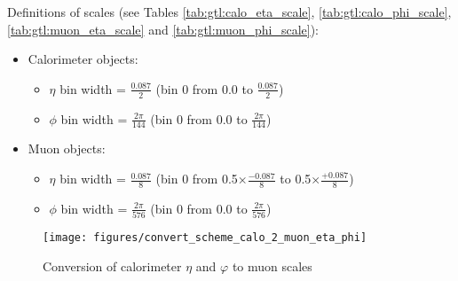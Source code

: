 Definitions of scales (see Tables \ref{tab:gtl:calo_eta_scale}, \ref{tab:gtl:calo_phi_scale}, \ref{tab:gtl:muon_eta_scale} and \ref{tab:gtl:muon_phi_scale}):
\begin{itemize}
\item Calorimeter objects:
\begin{itemize}
\item $\eta$ bin width = $\frac{0.087}{2}$ (bin 0 from 0.0 to $\frac{0.087}{2}$)
\item $\phi$ bin width = $\frac{2\pi}{144}$ (bin 0 from 0.0 to $\frac{2\pi}{144}$)
\end{itemize}
\item Muon objects:
\begin{itemize}
\item $\eta$ bin width = $\frac{0.087}{8}$ (bin 0 from \small{0.5}$\times\frac{-0.087}{8}$ to \small{0.5}$\times\frac{+0.087}{8}$)
\item $\phi$ bin width = $\frac{2\pi}{576}$ (bin 0 from 0.0 to $\frac{2\pi}{576}$)
\end{itemize}
\end{itemize}

\begin{figure}[htb]
\centering
\texttt{[image: figures/convert\_scheme\_calo\_2\_muon\_eta\_phi]}
\caption{Conversion of calorimeter $\eta$ and $\varphi$ to muon scales} 
\label{fig:gtl:convert_scheme_calo_2_muon_eta_phi}
\end{figure}

